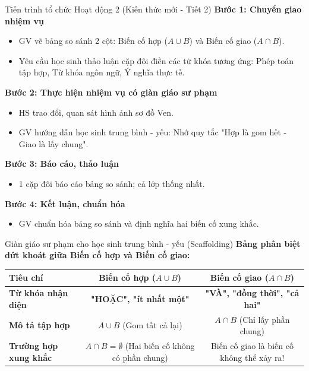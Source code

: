 \documentclass[12pt, a4paper]{article}
\begin{document}
\begin{pedabox}{Tiến trình tổ chức Hoạt động 2 (Kiến thức mới - Tiết 2)}
    \textbf{Bước 1: Chuyển giao nhiệm vụ}
    \begin{itemize}[leftmargin=0.6cm]
        \item GV vẽ bảng so sánh 2 cột: Biến cố hợp ($A \cup B$) và Biến cố giao ($A \cap B$).
        \item Yêu cầu học sinh thảo luận cặp đôi điền các từ khóa tương ứng: Phép toán tập hợp, Từ khóa ngôn ngữ, Ý nghĩa thực tế.
    \end{itemize}

    \textbf{Bước 2: Thực hiện nhiệm vụ có giàn giáo sư phạm}
    \begin{itemize}[leftmargin=0.6cm]
        \item HS trao đổi, quan sát hình ảnh sơ đồ Ven.
        \item GV hướng dẫn học sinh trung bình - yếu: Nhớ quy tắc "Hợp là gom hết - Giao là lấy chung".
    \end{itemize}

    \textbf{Bước 3: Báo cáo, thảo luận}
    \begin{itemize}[leftmargin=0.6cm]
        \item 1 cặp đôi báo cáo bảng so sánh; cả lớp thống nhất.
    \end{itemize}

    \textbf{Bước 4: Kết luận, chuẩn hóa}
    \begin{itemize}[leftmargin=0.6cm]
        \item GV chuẩn hóa bảng so sánh và định nghĩa hai biến cố xung khắc.
    \end{itemize}
\end{pedabox}

\begin{scaffoldbox}{Giàn giáo sư phạm cho học sinh trung bình - yếu (Scaffolding)}
    \textbf{Bảng phân biệt dứt khoát giữa Biến cố hợp và Biến cố giao:}
    \begin{center}
    \begin{tabular}{|l|c|c|}
    \hline
    \textbf{Tiêu chí} & \textbf{Biến cố hợp ($A \cup B$)} & \textbf{Biến cố giao ($A \cap B$)} \\ \hline
    \textbf{Từ khóa nhận diện} & \textbf{"HOẶC", "ít nhất một"} & \textbf{"VÀ", "đồng thời", "cả hai"} \\ \hline
    \textbf{Mô tả tập hợp} & $A \cup B$ (Gom tất cả lại) & $A \cap B$ (Chỉ lấy phần chung) \\ \hline
    \textbf{Trường hợp xung khắc} & $A \cap B = \emptyset$ (Hai biến cố không có phần chung) & Biến cố giao là biến cố không thể xảy ra! \\ \hline
    \end{tabular}
    \end{center}
\end{scaffoldbox}
\end{document}
